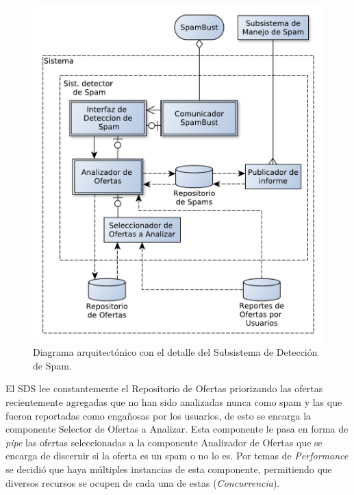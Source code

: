 \begin{figure}[H]
	\centering
	\includegraphics[width=\textwidth]{graficos/arch/Sistema_deteccion_spam.pdf}
	\caption{Diagrama arquitectónico con el detalle del \textsf{Subsistema de Detección de Spam}.}
\end{figure}

El SDS lee constantemente el \textsf{Repositorio de Ofertas} priorizando las ofertas recientemente agregadas que no han sido analizadas nunca como spam y las que fueron reportadas como enga\~{n}osas por los usuarios, de esto se encarga la componente \textsf{Selector de Ofertas a Analizar}. Esta componente le pasa en forma de \emph{pipe} las ofertas seleccionadas a la componente \textsf{Analizador de Ofertas} que se encarga de discernir si la oferta es un spam o no lo es. Por temas de \emph{Performance} se decidió que haya múltiples instancias de esta componente, permitiendo que diversos recursos se ocupen de cada una de estas (\emph{Concurrencia}).\\

